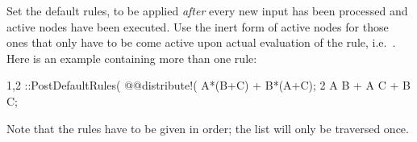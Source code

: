 
Set the default rules, to be applied \emph{after} every new input has
been processed and active nodes have been executed. Use the inert form
of active nodes for those ones that only have to be come active upon
actual evaluation of the rule,
i.e.~. Here is an example containing
more than one rule:
\begin{screen}{1,2}
::PostDefaultRules( @@distribute!(%
A*(B+C) + B*(A+C);
2 A B + A C + B C;
\end{screen}
Note that the rules have to be given in order; the list will only be
traversed once.

